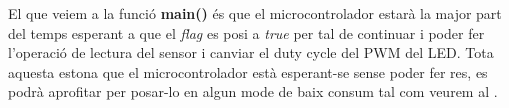 El que veiem a la funció {\bf main()} és que el microcontrolador estarà la major part del temps esperant a que el {\em flag} es posi a {\em true} per tal de continuar i poder fer l'operació de lectura del sensor i canviar el \gls{duty cycle} del \gls{PWM} del \gls{LED}. Tota aquesta estona que el microcontrolador està esperant-se sense poder fer res, es podrà aprofitar per posar-lo en algun mode de baix consum tal com veurem al .
